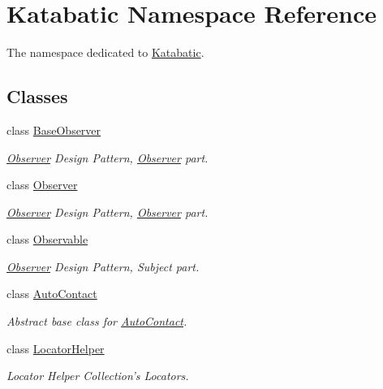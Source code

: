 \hypertarget{namespaceKatabatic}{\section{Katabatic Namespace Reference}
\label{namespaceKatabatic}
}


The namespace dedicated to \hyperlink{namespaceKatabatic}{Katabatic}.  


\subsection*{Classes}
\begin{DoxyCompactItemize}
\item 
class \hyperlink{classKatabatic_1_1BaseObserver}{Base\-Observer}
\begin{DoxyCompactList}\small\item\em \hyperlink{classKatabatic_1_1Observer}{Observer} Design Pattern, \hyperlink{classKatabatic_1_1Observer}{Observer} part. \end{DoxyCompactList}\item 
class \hyperlink{classKatabatic_1_1Observer}{Observer}
\begin{DoxyCompactList}\small\item\em \hyperlink{classKatabatic_1_1Observer}{Observer} Design Pattern, \hyperlink{classKatabatic_1_1Observer}{Observer} part. \end{DoxyCompactList}\item 
class \hyperlink{classKatabatic_1_1Observable}{Observable}
\begin{DoxyCompactList}\small\item\em \hyperlink{classKatabatic_1_1Observer}{Observer} Design Pattern, Subject part. \end{DoxyCompactList}\item 
class \hyperlink{classKatabatic_1_1AutoContact}{Auto\-Contact}
\begin{DoxyCompactList}\small\item\em Abstract base class for \hyperlink{classKatabatic_1_1AutoContact}{Auto\-Contact}. \end{DoxyCompactList}\item 
class \hyperlink{classKatabatic_1_1LocatorHelper}{Locator\-Helper}
\begin{DoxyCompactList}\small\item\em Locator Helper Collection's Locators. \end{DoxyCompactList}\item 

\end{DoxyCompactItemize}
